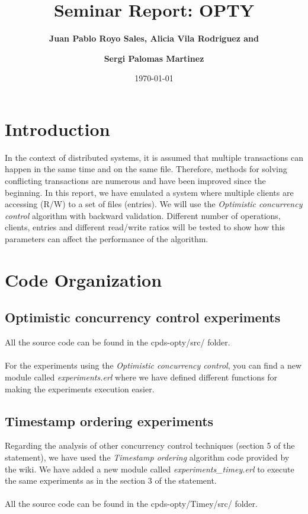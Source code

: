 \documentclass[a4paper, 10pt]{article}
\title{Seminar Report: OPTY}
\author{\textbf{Juan Pablo Royo Sales, Alicia Vila Rodriguez and} \\\and \textbf{Sergi Palomas Martinez}}
\date{\normalsize\today{}}
\begin{document}
\maketitle

\section{Introduction}

In the context of distributed systems, it is assumed that multiple transactions can happen in the same time and on the same file. Therefore, methods for solving conflicting transactions are numerous and have been improved since the beginning. In this report, we have emulated a system where multiple clients are accessing (R/W) to a set of files (entries). We will use the \textit{Optimistic concurrency control} algorithm with backward validation. Different number of operations, clients, entries and different read/write ratios will be tested to show how this parameters can affect the performance of the algorithm.

\section{Code Organization}


\subsection{Optimistic concurrency control experiments}

All the source code can be found in the cpds-opty/src/ folder.\\\\
For the experiments using the \textit{Optimistic concurrency control}, you can find a new module called \textit{experiments.erl} where we have defined different functions for making the experiments execution easier.

\subsection{Timestamp ordering experiments}

Regarding the analysis of other concurrency control techniques (section 5 of the statement), we have used the \textit{Timestamp ordering} algorithm code provided by the wiki. We have added a new module called \textit{experiments\_timey.erl} to execute the same experiments as in the section 3 of the statement. \\\\
All the source code can be found in the cpds-opty/Timey/src/ folder.
\end{document}
